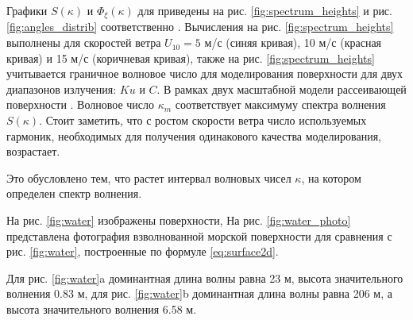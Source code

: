 Графики $S(\kappa)$ и  $\Phi_\xi(\kappa)$ для приведены на рис.
\ref{fig:spectrum_heights} и рис. \ref{fig:angles_distrib} соответственно
\cite{ryabkova}. 
Вычисления на рис. \ref{fig:spectrum_heights} выполнены для скоростей ветра 
$U_{10} = 5$ м/с (синяя кривая), 10 м/с (красная кривая) и 15 м/с (коричневая
кривая), также на  рис. \ref{fig:spectrum_heights} учитывается граничное волновое число
для моделирования поверхности для двух диапазонов излучения: $Ku$ и $C$. В
рамках двух масштабной модели  рассеивающей поверхности \cite{bass-and-fuks}.
Волновое число $\kappa_m$ соответствует  максимуму спектра волнения  $S(\kappa)$. Стоит
заметить, что с ростом скорости ветра число используемых гармоник, необходимых
для получения одинакового качества моделирования,
возрастает. 

Это обусловлено тем, что растет интервал волновых чисел $\kappa$, на котором
определен спектр волнения. 

На рис. \ref{fig:water} изображены поверхности,
На рис. \ref{fig:water_photo} представлена фотография взволнованной морской
поверхности для сравнения с рис. \ref{fig:water},
построенные по формуле \eqref{eq:surface2d}.

Для рис. \ref{fig:water}a доминантная длина волны равна 23 м, высота
значительного волнения 0.83 м, для рис. \ref{fig:water}b доминантная длина
волны равна 206 м, а высота значительного волнения 6.58 м.

